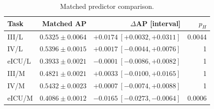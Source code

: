 \begin{table}[!tp]
\centering\small
\setlength{\tabcolsep}{2pt}
\caption{Matched predictor comparison.}
\label{tab:matched-controls}
\begin{tabular}{lrrr}
\toprule
Task & Matched AP & $\Delta$AP [interval] & $p_H$ \\
\midrule
III/L & $0.5325\pm0.0064$ & $+0.0174\ [+0.0032,+0.0311]$ & 0.0044 \\
IV/L & $0.5396\pm0.0015$ & $+0.0017\ [-0.0044,+0.0076]$ & 1 \\
eICU/L & $0.3933\pm0.0021$ & $-0.0001\ [-0.0086,+0.0082]$ & 1 \\
III/M & $0.4821\pm0.0021$ & $+0.0033\ [-0.0100,+0.0165]$ & 1 \\
IV/M & $0.5432\pm0.0023$ & $+0.0007\ [-0.0074,+0.0088]$ & 1 \\
eICU/M & $0.4086\pm0.0012$ & $-0.0165\ [-0.0273,-0.0064]$ & 0.0006 \\
\bottomrule
\end{tabular}
\par{}
\end{table}
